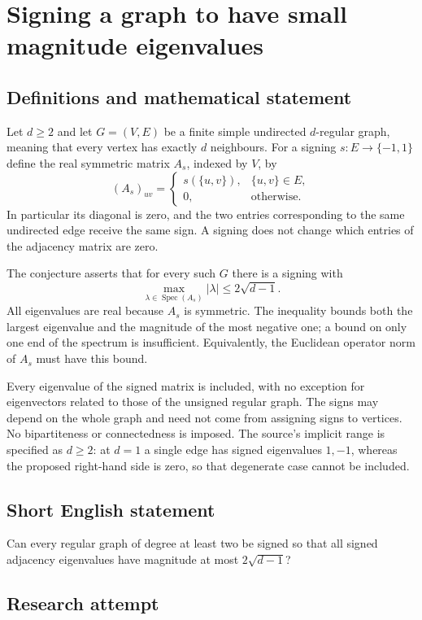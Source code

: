 \documentclass[11pt,a4paper]{article}
\begin{document}
\section*{Signing a graph to have small magnitude eigenvalues}\label{statement}

\subsection{Definitions and mathematical statement}
Let $d\ge2$ and let $G=(V,E)$ be a finite simple undirected $d$-regular
graph, meaning that every vertex has exactly $d$ neighbours.
For a signing $s:E\to\{-1,1\}$ define the real symmetric matrix
$A_s$, indexed by $V$, by
\[
 (A_s)_{uv}=\begin{cases}s(\{u,v\}),&\{u,v\}\in E,\\
                         0,&\text{otherwise}.\end{cases}
\]
In particular its diagonal is zero, and the two entries corresponding
to the same undirected edge receive the same sign. A signing does not
change which entries of the adjacency matrix are zero.

The conjecture asserts that for every such $G$ there is a signing with
\[
 \max_{\lambda\in\operatorname{Spec}(A_s)}|\lambda|
                 \le2\sqrt{d-1}.
\]
All eigenvalues are real because $A_s$ is symmetric. The inequality
bounds both the largest eigenvalue and the magnitude of the most
negative one; a bound on only one end of the spectrum is insufficient.
Equivalently, the Euclidean operator norm of $A_s$ must have this bound.

Every eigenvalue of the signed matrix is included, with no exception
for eigenvectors related to those of the unsigned regular graph.
The signs may depend on the whole graph and need not come from
assigning signs to vertices. No bipartiteness or connectedness is imposed.
The source's implicit range is specified as $d\ge2$: at $d=1$ a single
edge has signed eigenvalues $1,-1$, whereas the proposed right-hand
side is zero, so that degenerate case cannot be included.
\subsection{Short English statement}
Can every regular graph of degree at least two be signed so that all signed adjacency eigenvalues have magnitude at most $2\sqrt{d-1}$?
\subsection{Research attempt}
\end{document}
